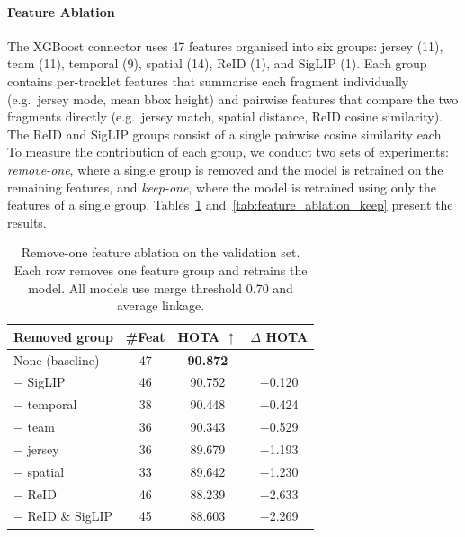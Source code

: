 \paragraph{Feature Ablation}\label{par:feature_ablation}

The XGBoost connector uses 47 features organised into six groups: jersey (11), team (11), temporal (9), spatial (14), ReID (1), and SigLIP (1). Each group contains per-tracklet features that summarise each fragment individually (e.g.\ jersey mode, mean bbox height) and pairwise features that compare the two fragments directly (e.g.\ jersey match, spatial distance, ReID cosine similarity). The ReID and SigLIP groups consist of a single pairwise cosine similarity each. To measure the contribution of each group, we conduct two sets of experiments: \emph{remove-one}, where a single group is removed and the model is retrained on the remaining features, and \emph{keep-one}, where the model is retrained using only the features of a single group. Tables~\ref{tab:feature_ablation_remove} and~\ref{tab:feature_ablation_keep} present the results.

\begin{table}[H]
\centering
\begin{tabular}{lccc}
\toprule
\textbf{Removed group} & \textbf{\#Feat} & \textbf{HOTA $\uparrow$} & \textbf{$\Delta$ HOTA} \\
\midrule
None (baseline)      & 47 & \textbf{90.872} & -- \\
$-$ SigLIP           & 46 & 90.752 & $-$0.120 \\
$-$ temporal         & 38 & 90.448 & $-$0.424 \\
$-$ team             & 36 & 90.343 & $-$0.529 \\
$-$ jersey           & 36 & 89.679 & $-$1.193 \\
$-$ spatial          & 33 & 89.642 & $-$1.230 \\
$-$ ReID             & 46 & 88.239 & $-$2.633 \\
$-$ ReID \& SigLIP   & 45 & 88.603 & $-$2.269 \\
\bottomrule
\end{tabular}
\caption{Remove-one feature ablation on the validation set. Each row removes one feature group and retrains the model. All models use merge threshold 0.70 and average linkage.}
\label{tab:feature_ablation_remove}
\end{table}

